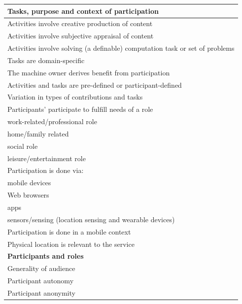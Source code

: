 \documentclass{sig-alternate}
\begin{document}
\begin{table}[htb]
\begin{center}
\begin{scriptsize}
\begin{tabular}{|p{8cm}|}
\hline
{\bf Tasks, purpose and context of participation} \\
\hline
Activities involve creative production of content \\
Activities involve subjective appraisal of content \\
Activities involve solving (a definable) computation task or set of problems\\
Tasks are domain-specific \\
The machine owner derives benefit from participation \\
Activities and tasks are pre-defined or participant-defined \\
Variation in types of contributions and tasks \\
Participants' participate to fulfill needs of a role  \\
\hspace{1cm} work-related/professional role \\
\hspace{1cm} home/family related \\
\hspace{1cm} social role \\
\hspace{1cm} leisure/entertainment role \\
Participation is done via: \\
\hspace{1cm} mobile devices \\
\hspace{1cm} Web browsers \\
\hspace{1cm} apps \\
\hspace{1cm} sensors/sensing (location sensing and wearable devices) \\
Participation is done in a mobile context \\
\hspace{1cm} Physical location is relevant to the service \\
\hline
{\bf Participants and roles} \\
\hline
Generality of audience \\
Participant autonomy \\
Participant anonymity \\

\end{tabular}
\end{scriptsize}
\end{center}
\end{table}
\end{document}
